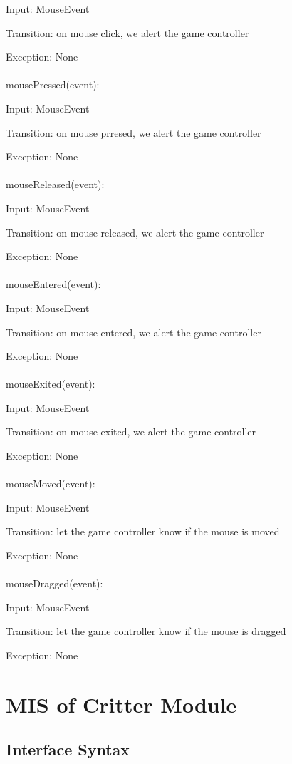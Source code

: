 \documentclass[12,english]{article}
\begin{document}
		Input: MouseEvent
		
		Transition: on mouse click, we alert the game controller
		
		Exception: None\\
		\\
		mousePressed(event):
		
		Input: MouseEvent
		
		Transition: on mouse prresed, we alert the game controller
		
		Exception: None\\
		\\
		mouseReleased(event):
		
		Input: MouseEvent
		
		Transition: on mouse released, we alert the game controller
		
		Exception: None\\
		\\
		mouseEntered(event):
		
		Input: MouseEvent
		
		Transition: on mouse entered, we alert the game controller
		
		Exception: None\\
		\\
		mouseExited(event):
		
		Input: MouseEvent
		
		Transition: on mouse exited, we alert the game controller
		
		Exception: None\\
		\\
		mouseMoved(event):
		
		Input: MouseEvent
		
		Transition: let the game controller know if the mouse is moved
		
		Exception: None\\
		\\
		mouseDragged(event):
		
		Input: MouseEvent
		
		Transition: let the game controller know if the mouse is dragged
		
		Exception: None
		\\
		
		
\section{MIS of Critter Module}
	\subsection{Interface Syntax}
\end{document}
